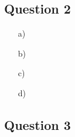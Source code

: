 \documentclass{article}
\begin{document}

\subsection*{Question 2}

\begin{itemize}
	\item[a)] 

	
	\item[b)] 


	\item[c)] 


	\item[d)] 


\end{itemize}


\subsection*{Question 3}
\end{document}
